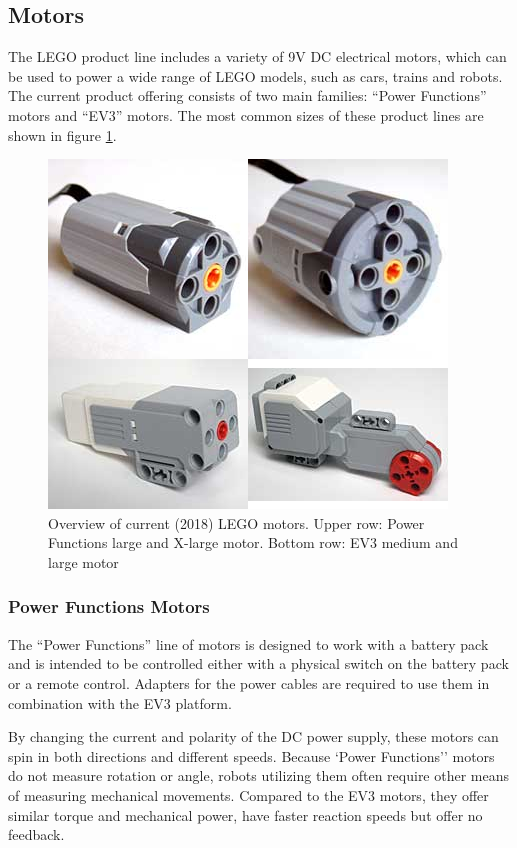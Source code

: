 \documentclass[11pt, a4paper]{article}
\begin{document}
\subsection{Motors}
The LEGO product line includes a variety of 9V DC electrical motors, which can be used to power a wide range of LEGO models, such as cars, trains and robots. The current product offering consists of two main families: ``Power Functions'' motors and ``EV3'' motors. The most common sizes of these product lines are shown in figure \ref{fig:motors}.

\begin{figure}
\centering
\includegraphics[width=0.6\linewidth]{images/motors}
\caption{Overview of current (2018) LEGO motors. Upper row: Power Functions large and X-large motor. Bottom row: EV3 medium and large motor}
\label{fig:motors}
\end{figure}


\subsubsection*{Power Functions Motors}
The ``Power Functions'' line of motors is designed to work with a battery pack and is intended to be controlled either with a physical switch on the battery pack or a remote control. Adapters for the power cables are required to use them in combination with the EV3 platform. \cite{power_fun}

By changing the current and polarity of the DC power supply, these motors can spin in both directions and different speeds. Because `Power Functions'' motors do not measure rotation or angle, robots utilizing them often require other means of measuring mechanical movements. Compared to the EV3 motors, they offer similar torque and mechanical power, have faster reaction speeds but offer no feedback. \cite{motor_comparison}
\end{document}
